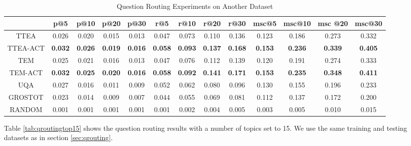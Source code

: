 {{{{{{{\begin{sidewaystable}
\caption{Question Routing Experiments on Another Dataset}
\label{tab:qrouting123456}
\centering
\begin{tabular}{|c|c|c|c|c|c|c|c|c|c|c|c|c|}
\hline
 & p@5    &p@10    &p@20   & p@30 &r@5 & r@10 & r@20 &r@30 & msc@5 & msc@10 &msc @20 &msc@30  \\ \hline
TTEA&0.026&0.020&0.015&0.013&0.047&0.073&0.110&0.136&0.123&0.186&0.273&0.332 \\ \hline
TTEA-ACT&\textbf{0.032}&\textbf{0.026}&\textbf{0.019}&\textbf{0.016}&\textbf{0.058}&\textbf{0.093}&\textbf{0.137}&\textbf{0.168}&\textbf{0.153}&\textbf{0.236}&\textbf{0.339}&\textbf{0.405} \\ \hline
TEM&0.025&0.021&0.016&0.013&0.047&0.076&0.112&0.139&0.120&0.191&0.274&0.333 \\ \hline
TEM-ACT&\textbf{0.032}&\textbf{0.025}&\textbf{0.020}&\textbf{0.016}&\textbf{0.058}&\textbf{0.092}&\textbf{0.141}&\textbf{0.171}&\textbf{0.153}&\textbf{0.235}&\textbf{0.348}&\textbf{0.411} \\ \hline
UQA&0.027&0.016&0.011&0.009&0.052&0.062&0.080&0.096&0.130&0.155&0.196&0.233 \\ \hline
GROSTOT&0.023&0.014&0.009&0.007&0.044&0.055&0.069&0.081&0.112&0.137&0.172&0.200 \\ \hline
RANDOM&0.001&0.001&0.001&0.001&0.001&0.002&0.004&0.005&0.003&0.005&0.010&0.015 \\ \hline
\end{tabular}
\end{sidewaystable}


Table \ref{tab:qroutingtop15} shows the question routing results with a number of topics set to 15. We use the same training and testing datasets as in section \ref{sec:qrouting}.

}}}}}}}
